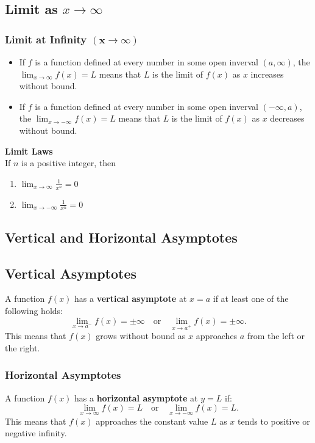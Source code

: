 \documentclass[11pt]{article}
\begin{document}
\subsection{Limit as $x\to\infty$}
\subsubsection*{Limit at Infinity $\boldsymbol{(x\to\infty)}$}
\begin{itemize}
    \item If $f$ is a function defined at every number in some open inverval $(a,\infty)$,
        the $\displaystyle\lim_{x\to\infty}f(x)=L$ means that $L$ is the limit of $f(x)$ 
        as $x$ increases without bound.
    \item If $f$ is a function defined at every number in some open inverval $(-\infty, a)$,
        the $\displaystyle\lim_{x\to-\infty}f(x)=L$ means that $L$ is the limit of $f(x)$ 
        as $x$ decreases without bound.
\end{itemize}
\textbf{Limit Laws}\\
If $n$ is a positive integer, then
\begin{enumerate}[label=(\alph*)]
    \item $
        \displaystyle 
        \lim_{x\to\infty}\frac{1}{x^n}=0
    $
    \item $
        \displaystyle 
        \lim_{x\to-\infty}\frac{1}{x^n}=0
    $
\end{enumerate}
\subsection{Vertical and Horizontal Asymptotes}
\subsection*{Vertical Asymptotes}
A function $f(x)$ has a \textbf{vertical asymptote} at $x = a$ if at least one of the following holds:
\[
    \lim_{x \to a^-} f(x) = \pm\infty \quad \text{or} \quad \lim_{x \to a^+} f(x) = \pm\infty.
\]
This means that $f(x)$ grows without bound as $x$ approaches $a$ from the left or the right.
\subsubsection*{Horizontal Asymptotes}
A function $f(x)$ has a \textbf{horizontal asymptote} at $y = L$ if:
\[
    \lim_{x \to \infty} f(x) = L \quad \text{or} \quad \lim_{x \to -\infty} f(x) = L.
\]
This means that $f(x)$ approaches the constant value $L$ as $x$ tends to positive or negative infinity.
\end{document}
